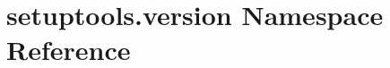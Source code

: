 \hypertarget{namespacesetuptools_1_1version}{}\section{setuptools.\+version Namespace Reference}
\label{namespacesetuptools_1_1version}
